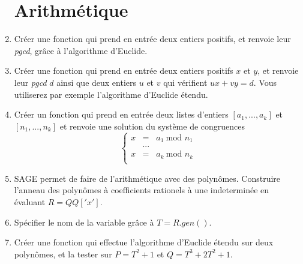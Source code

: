 \begin{enumerate}
\section{Arithmétique}
\item Créer une fonction qui prend en entrée deux entiers positifs, et renvoie leur \textit{pgcd}, grâce à l'algorithme d'Euclide.
\item Créer une fonction qui prend en entrée deux entiers positifs $x$ et $y$, et renvoie leur \textit{pgcd} $d$ ainsi que deux entiers $u$ et $v$ qui vérifient $ux+vy=d$. Vous utiliserez par exemple l'algorithme d'Euclide étendu.
\item Créer un fonction qui prend en entrée deux listes d'entiers $[a_1,...,a_k]$ et $[n_1,...,n_k]$ et renvoie une solution du système de congruences
\[\left\{\begin{array}{rcl}
 x & = & a_1 \ \text{mod }n_1\\
   &  ... & \\
 x & = & a_k \ \text{mod }n_k\\
\end{array}\right.\]
\item SAGE permet de faire de l'arithmétique avec des polynômes. Construire l'anneau des polynômes à coefficients rationels à une indeterminée en évaluant $R=QQ['x']$. 
\item Spécifier le nom de la variable grâce à $T=R.gen()$.
\item Créer une fonction qui effectue l'algorithme d'Euclide étendu sur deux polynômes, et la tester sur $P=T^2+1$ et $Q=T^3+2T^2+1$.

\end{enumerate}
